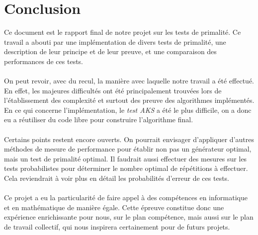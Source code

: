 	
	
	
	
	
	\section*{Conclusion}
		Ce document est le rapport final de notre projet sur les tests de primalité. Ce travail a abouti par une implémentation de divers tests de primalité, une description de leur principe et de leur preuve, et une comparaison des performances de ces tests.
		\paragraph{} On peut revoir, avec du recul, la manière avec laquelle notre travail a été effectué. En effet, les majeures difficultés ont été principalement trouvées lors de l'établissement des complexité et surtout des preuve des algorithmes implémentés. En ce qui concerne l'implémentation, le \textit{test AKS} a été le plus difficile, on a donc eu a réutiliser du code libre pour construire l'algorithme final.
		\paragraph{} Certains points restent encore ouverts. On pourrait envisager d'appliquer d'autres méthodes de mesure de performance pour établir non pas un générateur optimal, mais un test de primalité optimal. Il faudrait aussi effectuer des mesures sur les tests probabilistes pour déterminer le nombre optimal de répétitions à effectuer. Cela reviendrait à voir plus en détail les probabilités d'erreur de ces tests.
		\paragraph{} Ce projet a eu la particularité de faire appel à des compétences en informatique et en mathématique de manière égale. Cette épreuve constitue donc une expérience enrichissante pour nous, sur le plan compétence, mais aussi sur le plan de travail collectif, qui nous inspirera certainement pour de futurs projets.
	
		

